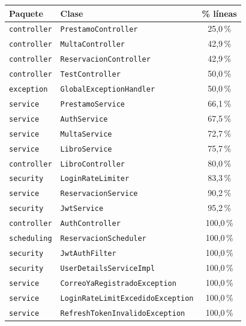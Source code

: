 \documentclass[12pt,a4paper]{article}
\begin{document}
\begin{center}
\small
\begin{longtable}{|l|l|c|}
\hline
\rowcolor{verdeuteq}
\color{white}\textbf{Paquete} & \color{white}\textbf{Clase} & \color{white}\textbf{\% líneas} \\
\hline
\endhead
\texttt{controller} & \texttt{PrestamoController} & 25{,}0\,\% \\
\hline
\texttt{controller} & \texttt{MultaController} & 42{,}9\,\% \\
\hline
\texttt{controller} & \texttt{ReservacionController} & 42{,}9\,\% \\
\hline
\texttt{controller} & \texttt{TestController} & 50{,}0\,\% \\
\hline
\texttt{exception} & \texttt{GlobalExceptionHandler} & 50{,}0\,\% \\
\hline
\texttt{service} & \texttt{PrestamoService} & 66{,}1\,\% \\
\hline
\texttt{service} & \texttt{AuthService} & 67{,}5\,\% \\
\hline
\texttt{service} & \texttt{MultaService} & 72{,}7\,\% \\
\hline
\texttt{service} & \texttt{LibroService} & 75{,}7\,\% \\
\hline
\texttt{controller} & \texttt{LibroController} & 80{,}0\,\% \\
\hline
\texttt{security} & \texttt{LoginRateLimiter} & 83{,}3\,\% \\
\hline
\texttt{service} & \texttt{ReservacionService} & 90{,}2\,\% \\
\hline
\texttt{security} & \texttt{JwtService} & 95{,}2\,\% \\
\hline
\texttt{controller} & \texttt{AuthController} & 100{,}0\,\% \\
\hline
\texttt{scheduling} & \texttt{ReservacionScheduler} & 100{,}0\,\% \\
\hline
\texttt{security} & \texttt{JwtAuthFilter} & 100{,}0\,\% \\
\hline
\texttt{security} & \texttt{UserDetailsServiceImpl} & 100{,}0\,\% \\
\hline
\texttt{service} & \texttt{CorreoYaRegistradoException} & 100{,}0\,\% \\
\hline
\texttt{service} & \texttt{LoginRateLimitExcedidoException} & 100{,}0\,\% \\
\hline
\texttt{service} & \texttt{RefreshTokenInvalidoException} & 100{,}0\,\% \\
\hline
\end{longtable}
\end{center}
\end{document}
